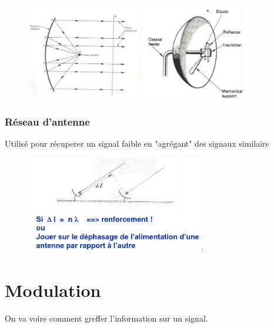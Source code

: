 \documentclass[12pt]{article}
\begin{document}
		\begin{figure}[htp]
			\centering
			\includegraphics[width=0.45\textwidth]{img/parabole.png}
			\includegraphics[width=0.45\textwidth]{img/parabole2.png}
		\end{figure}
	\subsubsection{Réseau d'antenne}
		Utilisé pour récuperer un signal faible en "agrégant" des signaux similaire
		\begin{figure}[htp]
			\centering
			\includegraphics[width=0.7\textwidth]{img/reseauAntennes.png}
		\end{figure}


\newpage		
\section{Modulation}
	On va voire comment greffer l'information sur un signal.
	
\end{document}
